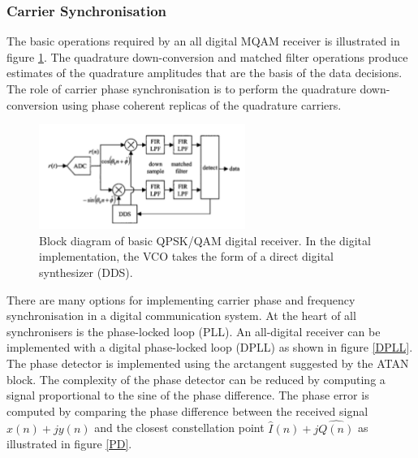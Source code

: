 \documentclass[12pt,a4paper,openright]{article}
\begin{document}
\subsubsection{Carrier Synchronisation}

The basic operations required by an all digital MQAM receiver is illustrated in figure \ref{rxMQAM}. The quadrature down-conversion and matched filter operations produce estimates of the quadrature amplitudes that are the basis of the data decisions. The role of carrier phase synchronisation is to perform the quadrature down-conversion using phase coherent replicas of the quadrature carriers.

 \begin{figure}[h]
  \centering
    \includegraphics[width=0.6\textwidth]{rxMQAM.pdf}
    \caption{Block diagram of basic QPSK/QAM digital receiver. In the digital implementation, the VCO takes the form of a direct digital synthesizer (DDS). }
    \label{rxMQAM}
\end{figure}

There are many options for implementing carrier phase and frequency synchronisation in a digital communication system. At the heart of all synchronisers is the phase-locked loop (PLL). An all-digital receiver can be implemented with a digital phase-locked loop (DPLL) as shown in figure \ref{DPLL}. The phase detector is implemented using the arctangent suggested by the ATAN block. The complexity of the phase detector can be reduced by computing a signal proportional to the sine of the phase difference. The phase error is computed by comparing the phase difference between the received signal $x(n) + jy(n)$ and the closest constellation point $\hat{I}(n) + j\hat{Q(n)}$ as illustrated in figure \ref{PD}.
\end{document}
